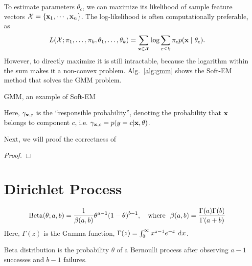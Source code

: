 To estimate parameters $\theta_c$, we can maximize its likelihood of sample feature vectors $\mathcal{X} = \{ \mathbf{x}_1, \cdots, \mathbf{x}_n\}$. The log-likelihood is often computationally preferable, as
\begin{equation}
	L(\mathcal{X}; \pi_{1}, \ldots, \pi_{k}, {\theta}_{1}, \ldots, {\theta}_{k}) = \sum_{\mathbf{x} \in \mathcal{X}} \log \sum_{c\leq k}{\pi_c p(\mathbf{x} \mid \theta_c)}.
\end{equation}
However, to directly maximize it is still intractable, because the logarithm within the sum makes it a non-convex problem. Alg.~\ref{alg:gmm} shows the Soft-EM method that solves the GMM problem.

\begin{algorithm}[H]
 \caption{GMM, an example of Soft-EM \label{alg:gmm}}
\SetAlgoLined
 
\end{algorithm}
Here, $\gamma_{\mathbf{x}, c}$ is the ``responsible probability'', denoting the probability that $\mathbf{x}$ belongs to component $c$, i.e. $\gamma_{\mathbf{x}, c} = p(y = c | \mathbf{x}, \theta)$. 

Next, we will proof the correctness of 
\begin{proof}
	
\end{proof}
\section{Dirichlet Process}

\begin{definition}
	$$
	\mathrm{Beta}(\theta; a, b) = \frac{1}{\beta(a, b)} \theta^{a-1} (1-\theta)^{b - 1}, \quad \text{where}\ \  \beta(a, b) = \frac{\Gamma(a)\Gamma(b)}{\Gamma(a + b)}
	$$
	Here, $\Gamma(z)$ is the Gamma function, $\Gamma(z) = \int_0^\infty x^{z-1} e^{-x} \ \mathrm{d}x$.
\end{definition}
\remark Beta distribution is the probability $\theta$ of a Bernoulli process after observing $a - 1$ successes and $b - 1$ failures. 

